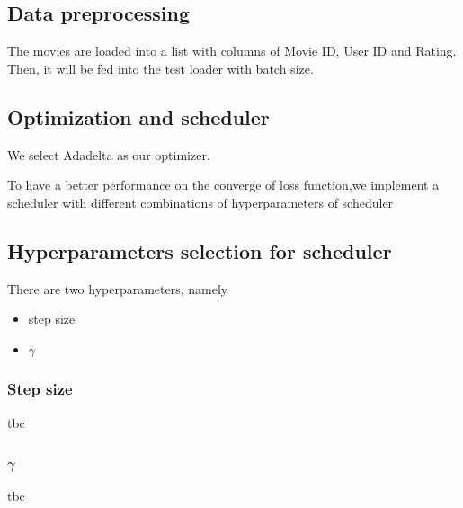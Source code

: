 \documentclass[final]{cvpr}
\begin{document}
\subsection{Data preprocessing}
The movies are loaded into a list with columns of Movie ID, User ID and Rating. Then, it will be fed into the test loader with batch size.





\subsection{Optimization and scheduler}
We select Adadelta as our optimizer. 

To have a better performance on the converge of loss function,we implement a scheduler with different combinations of hyperparameters of scheduler
\subsection{Hyperparameters selection for scheduler}
There are two hyperparameters, namely
\begin{itemize}
    \item step size
    \item $\gamma$
\end{itemize}

\subsubsection{Step size}
tbc

\subsubsection{$\gamma$}
tbc
\end{document}
